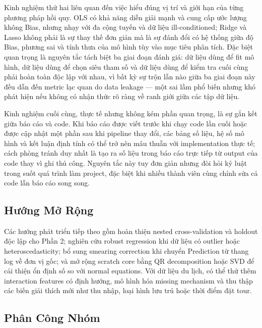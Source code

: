 Kinh nghiệm thứ hai liên quan đến việc hiểu đúng vị trí và giới hạn của từng phương pháp hồi quy. OLS có khả năng diễn giải mạnh và cung cấp ước lượng không Bias, nhưng nhạy với đa cộng tuyến và dữ liệu ill-conditioned; Ridge và Lasso không phải là sự thay thế đơn giản mà là sự đánh đổi có hệ thống giữa độ Bias, phương sai và tính thưa của mô hình tùy vào mục tiêu phân tích. Đặc biệt quan trọng là nguyên tắc tách biệt ba giai đoạn đánh giá: dữ liệu dùng để fit mô hình, dữ liệu dùng để chọn siêu tham số và dữ liệu dùng để kiểm tra cuối cùng phải hoàn toàn độc lập với nhau, vì bất kỳ sự trộn lẫn nào giữa ba giai đoạn này đều dẫn đến metric lạc quan do data leakage --- một sai lầm phổ biến nhưng khó phát hiện nếu không có nhận thức rõ ràng về ranh giới giữa các tập dữ liệu.

Kinh nghiệm cuối cùng, thực tế nhưng không kém phần quan trọng, là sự gắn kết giữa báo cáo và code. Khi báo cáo được viết trước khi chạy code lần cuối hoặc được cập nhật một phần sau khi pipeline thay đổi, các bảng số liệu, hệ số mô hình và kết luận định tính có thể trở nên mâu thuẫn với implementation thực tế; cách phòng tránh duy nhất là tạo ra số liệu trong báo cáo trực tiếp từ output của code thay vì ghi thủ công. Nguyên tắc này tuy đơn giản nhưng đòi hỏi kỷ luật trong suốt quá trình làm project, đặc biệt khi nhiều thành viên cùng chỉnh sửa cả code lẫn báo cáo song song.

\subsection{Hướng Mở Rộng}

Các hướng phát triển tiếp theo gồm hoàn thiện nested cross-validation và
holdout độc lập cho Phần 2; nghiên cứu robust regression khi dữ liệu có outlier
hoặc heteroscedasticity; bổ sung smearing correction khi chuyển Prediction từ
thang log về đơn vị gốc; và mở rộng scratch core bằng QR decomposition hoặc SVD
để cải thiện ổn định số so với normal equations. Với dữ liệu du lịch, có thể
thử thêm interaction features có định hướng, mô hình hóa missing mechanism và
thu thập các biến giải thích mới như thu nhập, loại hình lưu trú hoặc thời điểm
đặt tour.

\subsection{Phân Công Nhóm}

